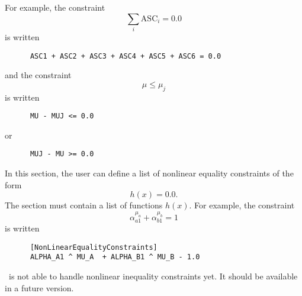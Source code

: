 \documentclass[12pt]{memoir}
\begin{document}
\begin{description}
      For example, the constraint
      \[
      \sum_i \text{ASC}_i = 0.0
      \]
      is written
{\footnotesize
      \begin{verbatim}
      ASC1 + ASC2 + ASC3 + ASC4 + ASC5 + ASC6 = 0.0
      \end{verbatim}
}
      and the constraint
      \[
      \mu \leq \mu_j
      \]
      is written 
{\footnotesize
      \begin{verbatim}
      MU - MUJ <= 0.0
      \end{verbatim}
}
      or
{\footnotesize
      \begin{verbatim}
      MUJ - MU >= 0.0
      \end{verbatim}
}

   \item[\specitem{NonLinearEqualityConstraints}]
      In this section, the user can define a list of nonlinear equality constraints of the form 
      \[
      h(x) = 0.0.
      \]
      The section must contain a list of functions $h(x)$. For example, the constraint
      \[
      \alpha_{a1}^{\mu_a} + \alpha_{b1}^{\mu_b} = 1
      \]
      is written
{\footnotesize
      \begin{verbatim}
      [NonLinearEqualityConstraints]
      ALPHA_A1 ^ MU_A  + ALPHA_B1 ^ MU_B - 1.0
      \end{verbatim}
}

   \item[\specitem{NonLinearInequalityConstraints}] 
      \BIOGEME\ is not able to handle nonlinear inequality constraints yet. It should be available in a future version.



\end{description}
\end{document}
